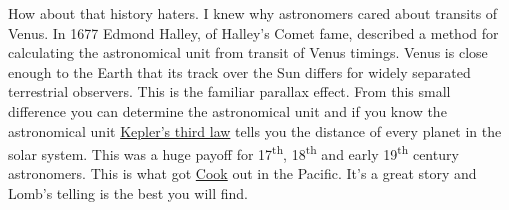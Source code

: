 How about that history haters. I knew why astronomers cared about
transits of Venus. In 1677 Edmond Halley, of Halley's Comet fame,
described a method for calculating the astronomical unit from transit of
Venus timings. Venus is close enough to the Earth that its track over
the Sun differs for widely separated terrestrial observers. This is the
familiar parallax effect. From this small difference you can determine
the astronomical unit and if you know the astronomical unit
\href{http://csep10.phys.utk.edu/astr161/lect/history/kepler.html}{Kepler's
third law} tells you the distance of every planet in the solar system.
This was a huge payoff for 17\textsuperscript{th},
18\textsuperscript{th} and early 19\textsuperscript{th} century
astronomers. This is what got
\href{http://www.captaincooksociety.com/}{Cook} out in the Pacific. It's
a great story and Lomb's telling is the best you will find.\emph{}





%